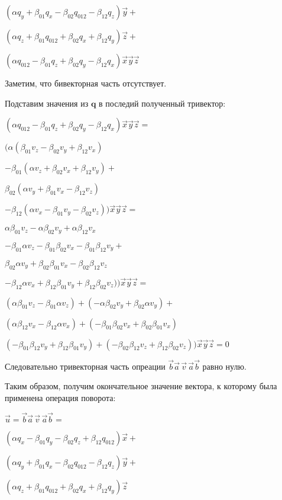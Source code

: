 \documentclass{article} %
\begin{document}
{$(\alpha q_y + \beta_{01} q_x - \beta_{02} q_{012} - \beta_{12} q_z) \vec{y} +$

$(\alpha q_z + \beta_{01} q_{012} + \beta_{02} q_x + \beta_{12} q_y) \vec{z} +$

$(\alpha q_{012} - \beta_{01} q_z + \beta_{02} q_y - \beta_{12} q_x) \vec{x}\vec{y}\vec{z}$

\hfill

\noindent
Заметим, что бивекторная часть отсутствует.

\hfill

\noindent
Подставим значения из $\mathbf q$ в последий полученный тривектор:

$(\alpha q_{012} - \beta_{01} q_z + \beta_{02} q_y - \beta_{12} q_x) \vec{x}\vec{y}\vec{z} =$

\hfill

$(\alpha (\beta_{01} v_z - \beta_{02} v_y + \beta_{12} v_x)$

$- \beta_{01} (\alpha v_z + \beta_{02} v_x + \beta_{12} v_y) +$

$\beta_{02} (\alpha v_y + \beta_{01} v_x - \beta_{12} v_z)$

$- \beta_{12} (\alpha v_x - \beta_{01} v_y - \beta_{02} v_z)) \vec{x}\vec{y}\vec{z} =$

\hfill

$\alpha \beta_{01} v_z - \alpha \beta_{02} v_y + \alpha \beta_{12} v_x$

$- \beta_{01} \alpha v_z - \beta_{01} \beta_{02} v_x - \beta_{01} \beta_{12} v_y +$

$\beta_{02} \alpha v_y + \beta_{02} \beta_{01} v_x - \beta_{02} \beta_{12} v_z$

$- \beta_{12} \alpha v_x + \beta_{12} \beta_{01} v_y + \beta_{12} \beta_{02} v_z)) \vec{x}\vec{y}\vec{z} =$

\hfill

$(\alpha \beta_{01} v_z - \beta_{01} \alpha v_z) + (- \alpha \beta_{02} v_y + \beta_{02} \alpha v_y) +$

$(\alpha \beta_{12} v_x - \beta_{12} \alpha v_x) + (- \beta_{01} \beta_{02} v_x + \beta_{02} \beta_{01} v_x)$

$(- \beta_{01} \beta_{12} v_y + \beta_{12} \beta_{01} v_y) + (- \beta_{02} \beta_{12} v_z + \beta_{12} \beta_{02} v_z)) \vec{x}\vec{y}\vec{z} = 0$

\hfill

\noindent
Следовательно тривекторная часть опреации $\vec{b}\vec{a}\, \vec{v}\, \vec{a}\vec{b}$ равно нулю.

\hfill

\noindent
Таким образом, получим окончательное значение вектора, к которому была применена операция поворота:

\hfill

$\vec{u} = \vec{b}\vec{a}\, \vec{v}\, \vec{a}\vec{b} =$

$(\alpha q_x - \beta_{01} q_y - \beta_{02} q_z + \beta_{12} q_{012}) \vec{x} +$

$(\alpha q_y + \beta_{01} q_x - \beta_{02} q_{012} - \beta_{12} q_z) \vec{y} +$

$(\alpha q_z + \beta_{01} q_{012} + \beta_{02} q_x + \beta_{12} q_y) \vec{z}$

}
\end{document}
